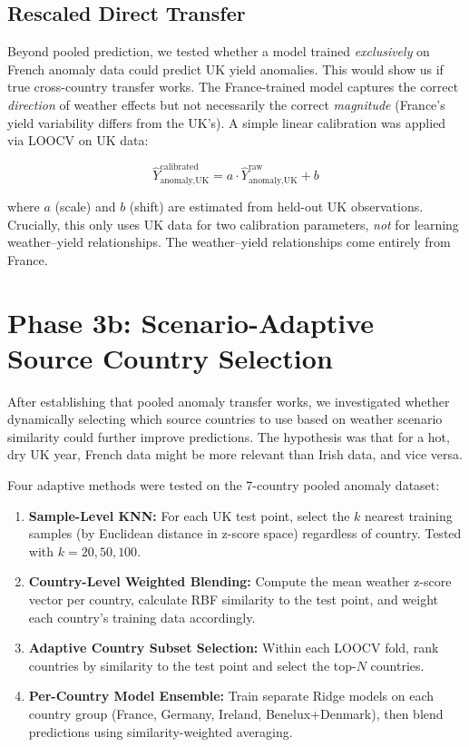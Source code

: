 \documentclass[12pt,a4paper]{report}
\begin{document}
\subsection{Rescaled Direct Transfer}

Beyond pooled prediction, we tested whether a model trained \emph{exclusively} on French anomaly data could predict UK yield anomalies. This would show us if true cross-country transfer works. The France-trained model captures the correct \emph{direction} of weather effects but not necessarily the correct \emph{magnitude} (France's yield variability differs from the UK's). A simple linear calibration was applied via LOOCV on UK data:

\begin{equation}
    \hat{Y}_{\text{anomaly,UK}}^{\text{calibrated}} = a \cdot \hat{Y}_{\text{anomaly,UK}}^{\text{raw}} + b
\end{equation}

where $a$ (scale) and $b$ (shift) are estimated from held-out UK observations. Crucially, this only uses UK data for two calibration parameters, \emph{not} for learning weather--yield relationships. The weather--yield relationships come entirely from France.

\section{Phase 3b: Scenario-Adaptive Source Country Selection}
\label{sec:adaptive_selection}

After establishing that pooled anomaly transfer works, we investigated whether dynamically selecting which source countries to use based on weather scenario similarity could further improve predictions. The hypothesis was that for a hot, dry UK year, French data might be more relevant than Irish data, and vice versa.

Four adaptive methods were tested on the 7-country pooled anomaly dataset:

\begin{enumerate}
    \item \textbf{Sample-Level KNN:} For each UK test point, select the $k$ nearest training samples (by Euclidean distance in z-score space) regardless of country. Tested with $k = 20, 50, 100$.
    \item \textbf{Country-Level Weighted Blending:} Compute the mean weather z-score vector per country, calculate RBF similarity to the test point, and weight each country's training data accordingly.
    \item \textbf{Adaptive Country Subset Selection:} Within each LOOCV fold, rank countries by similarity to the test point and select the top-$N$ countries.
    \item \textbf{Per-Country Model Ensemble:} Train separate Ridge models on each country group (France, Germany, Ireland, Benelux+Denmark), then blend predictions using similarity-weighted averaging.
\end{enumerate}
\end{document}
